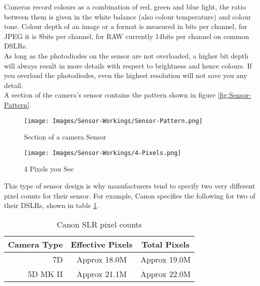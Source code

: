 Cameras record colours as a combination of red, green and blue light, the ratio between them is given in the white balance (also colour temperature) and colour tone. Colour depth of an image or a format is measured in bits per channel, for \gls{JPEG} it is 8bits per channel, for \gls{RAW} currently 14bits per channel on common \glspl{DSLR}.
\\[\baselineskip]
As long as the photodiodes on the \gls{sensor} are not overloaded, a higher bit depth will always result in more details with respect to brightness and hence colours. If you overload the photodiodes, even the highest resolution will not save you any detail.
\\[\baselineskip]
A section of the camera's \gls{sensor} contains the pattern shown in figure \ref{fig:Sensor-Pattern}.

\begin{figure}[htb]
\begin{minipage}{.5\textwidth}
\centering
		\texttt{[image: Images/Sensor-Workings/Sensor-Pattern.png]}
	\caption{Section of a camera Sensor}
	\label{fig:Sensor-Pattern}
\end{minipage}
\begin{minipage}{.5\textwidth}
\centering
		\texttt{[image: Images/Sensor-Workings/4-Pixels.png]}
	\caption{4 Pixels you See}
	\label{fig:4-Pixels}
\end{minipage}
\end{figure}

This type of \gls{sensor} design is why manufacturers tend to specify two very different pixel counts for their sensor. For example, Canon specifies the following for two of their \glspl{DSLR}, shown in table \ref{tab:CanonSLRPixelCounts}.

\begin{table}[htb]
	\centering
		\begin{tabular}{|r|cc|}
		\hline
		Camera Type & Effective Pixels & Total Pixels \\
		\hline
		7D & Approx 18.0M & Approx 19.0M \\
		5D MK II & Approx 21.1M & Approx 22.0M\\
		\hline	
		\end{tabular}
	\caption{Canon SLR pixel counts}
	\label{tab:CanonSLRPixelCounts}
\end{table}

